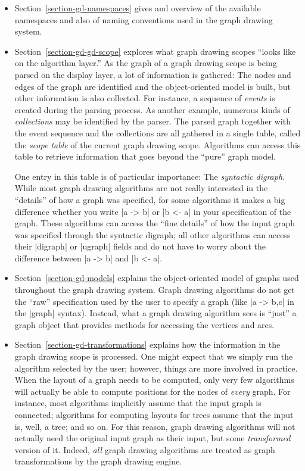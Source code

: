 \begin{itemize}
\item Section~\ref{section-gd-namespaces} gives and overview of the
  available namespaces and also of naming conventions used in the
  graph drawing system.
\item Section~\ref{section-gd-gd-scope} explores what graph
  drawing scopes ``looks like on the algorithm layer.'' As the graph
  of a graph drawing scope is being parsed on the display layer, a lot
  of information is gathered: The nodes and edges of the graph are
  identified and the 
  object-oriented model is built, but other information is also
  collected. For instance, a sequence of \emph{events} is created
  during the parsing process. As another example, numerous kinds of
  \emph{collections} may be identified by the parser. The parsed graph
  together with the event sequence and the collections are all
  gathered in a single table, called the \emph{scope table} of the
  current graph drawing scope. Algorithms can access this table to
  retrieve information that goes beyond the ``pure'' graph model.

  One entry in this table is of particular importance: The
  \emph{syntactic digraph.} While most graph drawing 
  algorithms are not really interested in the ``details'' of how a
  graph was specified, for some algorithms it makes a big difference
  whether you write |a -> b| or |b <- a| in your specification of the
  graph. These algorithms can access the ``fine details'' of how the
  input graph was specified through the syntactic digraph; all other
  algorithms can access their |digraph| or |ugraph| fields and do not
  have to worry about the difference between |a -> b| and |b <- a|.
\item Section~\ref{section-gd-models} explains the object-oriented
  model of graphs used throughout the graph drawing system. Graph
  drawing algorithms do not get the ``raw'' specification used by the
  user to specify a graph (like |{a -> {b,c}}| in the |graph|
  syntax). Instead, what a graph drawing algorithm sees is ``just'' a
  graph object that provides methods for accessing the vertices and
  arcs.
\item Section~\ref{section-gd-transformations} explains how the
  information in the graph drawing scope is processed. One might
  expect that we simply run the algorithm selected by the user;
  however, things are more involved in practice. When the layout of a
  graph needs to be computed, only very few algorithms will actually
  be able to compute positions for the nodes of \emph{every}
  graph. For instance, most algorithms implicitly assume that the
  input graph is connected; algorithms for computing layouts for trees
  assume that the input is, well, a tree; and so on. For this reason,
  graph drawing algorithms will not actually need the original input
  graph as their input, but some \emph{transformed} version of
  it. Indeed, \emph{all} graph drawing algorithms are treated as graph 
  transformations by the graph drawing engine.


\end{itemize}
